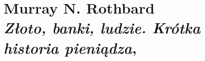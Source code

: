 \documentclass[a4paper,11pt]{article}
\numberwithin{equation}{section}
\begin{document}










\section{ %
  Murray N. Rothbard \\
  \textit{Złoto, banki, ludzie. Krótka historia pieniądza},
  \cite{RothbardZlotoBankiLudzie2016}}














\end{document}
